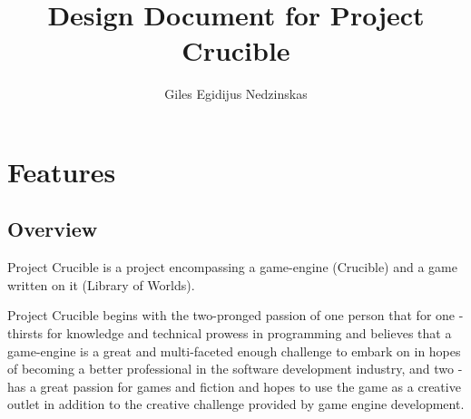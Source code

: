 \documentclass[a4paper,10pt]{book}
\begin{document}
\newcommand{\Projectname}{Project Crucible}
\newcommand{\Enginename}{Crucible}
\newcommand{\Gamename}{Library of Worlds}
\newcommand{\enginenamespace}{cru::}
\newcommand{\admonition}[3][white]{
  \begin{table*}[h]
  \colorbox{#1}{
  \begin{tabular}{p{0.1\linewidth} | l}
    {#2} &
    \begin{minipage}{0.9\linewidth - 2cm}
      {#3}
    \end{minipage}
  \end{tabular}
  }
  \end{table*}
}
\newcommand{\TODO}[1]{
  \admonition[red!10]{\textcolor{red}{TODO}}{\textcolor{red}{#1}}
}
\newcommand{\danger}[1]{
  \admonition[red!10]{\textcolor{red}{DNGR}}{#1}
}
\newcommand{\note}[1]{\admonition[blue!10]{NOTE}{#1}}
\newcommand{\think}[1]{\admonition[orange!15]{THNK}{\textcolor{orange}{#1}}}
\newcommand{\textbi}[1]{\textbf{\textit{#1}}}
\newcommand{\codew}[1]{\mbox{\texttt{#1}}}

\author{Giles Egidijus Nedzinskas}
\title{Design Document for \Projectname{}}
\maketitle{}

\tableofcontents

\part{Features}

\chapter{Overview}
\Projectname{} is a project encompassing a game-engine (\Enginename{}) and a game written on it (\Gamename{}).

\Projectname{} begins with the two-pronged passion of one person that for one - thirsts for knowledge and technical prowess in programming and believes that a game-engine is a great and multi-faceted enough challenge to embark on in hopes of becoming a better professional in the software development industry, and two - has a great passion for games and fiction and hopes to use the game as a creative outlet in addition to the creative challenge provided by game engine development.
\end{document}
